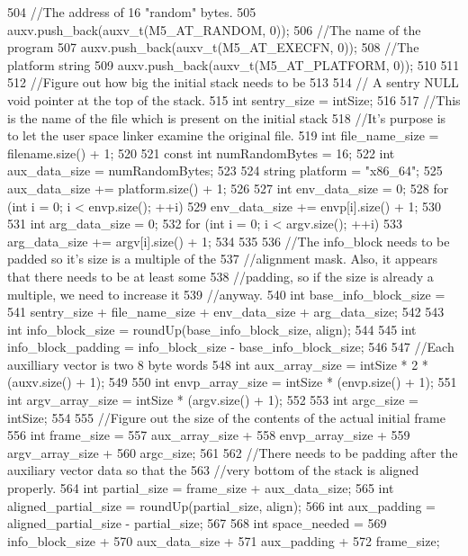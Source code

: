 \begin{DoxyCode}
{{504         //The address of 16 "random" bytes.
505         auxv.push_back(auxv_t(M5_AT_RANDOM, 0));
506         //The name of the program
507         auxv.push_back(auxv_t(M5_AT_EXECFN, 0));
508         //The platform string
509         auxv.push_back(auxv_t(M5_AT_PLATFORM, 0));
510     }
511 
512     //Figure out how big the initial stack needs to be
513 
514     // A sentry NULL void pointer at the top of the stack.
515     int sentry_size = intSize;
516 
517     //This is the name of the file which is present on the initial stack
518     //It's purpose is to let the user space linker examine the original file.
519     int file_name_size = filename.size() + 1;
520 
521     const int numRandomBytes = 16;
522     int aux_data_size = numRandomBytes;
523 
524     string platform = "x86_64";
525     aux_data_size += platform.size() + 1;
526 
527     int env_data_size = 0;
528     for (int i = 0; i < envp.size(); ++i) {
529         env_data_size += envp[i].size() + 1;
530     }
531     int arg_data_size = 0;
532     for (int i = 0; i < argv.size(); ++i) {
533         arg_data_size += argv[i].size() + 1;
534     }
535 
536     //The info_block needs to be padded so it's size is a multiple of the
537     //alignment mask. Also, it appears that there needs to be at least some
538     //padding, so if the size is already a multiple, we need to increase it
539     //anyway.
540     int base_info_block_size =
541         sentry_size + file_name_size + env_data_size + arg_data_size;
542 
543     int info_block_size = roundUp(base_info_block_size, align);
544 
545     int info_block_padding = info_block_size - base_info_block_size;
546 
547     //Each auxilliary vector is two 8 byte words
548     int aux_array_size = intSize * 2 * (auxv.size() + 1);
549 
550     int envp_array_size = intSize * (envp.size() + 1);
551     int argv_array_size = intSize * (argv.size() + 1);
552 
553     int argc_size = intSize;
554 
555     //Figure out the size of the contents of the actual initial frame
556     int frame_size =
557         aux_array_size +
558         envp_array_size +
559         argv_array_size +
560         argc_size;
561 
562     //There needs to be padding after the auxiliary vector data so that the
563     //very bottom of the stack is aligned properly.
564     int partial_size = frame_size + aux_data_size;
565     int aligned_partial_size = roundUp(partial_size, align);
566     int aux_padding = aligned_partial_size - partial_size;
567 
568     int space_needed =
569         info_block_size +
570         aux_data_size +
571         aux_padding +
572         frame_size;
}
\end{DoxyCode}
